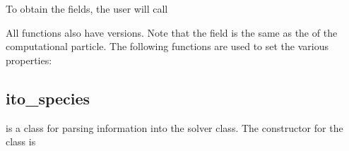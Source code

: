\documentclass[letterpaper,10pt,english]{sphinxmanual}
\begin{document}
\sphinxAtStartPar
To obtain the fields, the user will call

\begin{sphinxVerbatim}[commandchars=\\\{\},formatcom=\scriptsize]
 
 
 
 
\end{sphinxVerbatim}

\sphinxAtStartPar
All functions also have  versions.
Note that the field  is the same as the  of the computational particle.
The following functions are used to set the various properties:

\begin{sphinxVerbatim}[commandchars=\\\{\},formatcom=\scriptsize]
  
  
  
  
\end{sphinxVerbatim}


\subsection{ito\_species}
\label{\detokenize{Solvers/Ito:ito-species}}\label{\detokenize{Solvers/Ito:chap-ito-species}}
\sphinxAtStartPar
{} is a class for parsing information into the solver class.
The constructor for the  class is

\begin{sphinxVerbatim}[commandchars=\\\{\},formatcom=\scriptsize]
           
\end{sphinxVerbatim}
\end{document}
